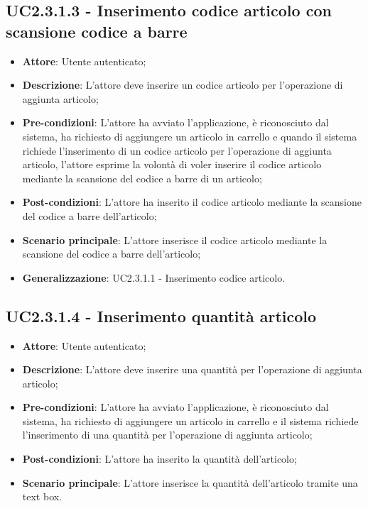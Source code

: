 \subsection{UC2.3.1.3 - Inserimento codice articolo con scansione codice a barre}

\begin{itemize}
	\item \textbf{Attore}: Utente autenticato;
	\item \textbf{Descrizione}: L'attore deve inserire un codice articolo per l'operazione di aggiunta articolo;
	\item \textbf{Pre-condizioni}: L'attore ha avviato l'applicazione, è riconosciuto dal sistema, ha richiesto di aggiungere un articolo in carrello e quando il sistema richiede l'inserimento di un codice articolo per l'operazione di aggiunta articolo, l'attore esprime la volontà di voler inserire il codice articolo mediante la scansione del codice a barre di un articolo;
	\item \textbf{Post-condizioni}: L'attore ha inserito il codice articolo mediante la scansione del codice a barre dell'articolo;
	\item \textbf{Scenario principale}: L'attore inserisce il codice articolo mediante la scansione del codice a barre dell'articolo;
	\item \textbf{Generalizzazione}: UC2.3.1.1 - Inserimento codice articolo.
\end{itemize}

\subsection{UC2.3.1.4 - Inserimento quantità articolo}

\begin{itemize}
	\item \textbf{Attore}: Utente autenticato;
	\item \textbf{Descrizione}: L'attore deve inserire una quantità per l'operazione di aggiunta articolo;
	\item \textbf{Pre-condizioni}: L'attore ha avviato l'applicazione, è riconosciuto dal sistema, ha richiesto di aggiungere un articolo in carrello e il sistema richiede l'inserimento di una quantità per l'operazione di aggiunta articolo;
	\item \textbf{Post-condizioni}: L'attore ha inserito la quantità dell'articolo;
	\item \textbf{Scenario principale}: L'attore inserisce la quantità dell'articolo tramite una text box.
\end{itemize}

